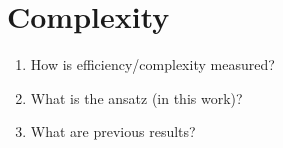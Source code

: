 \chapter{Complexity}
\label{chap:Complexity}

\begin{enumerate}
 \item How is efficiency/complexity measured?
 \item What is the ansatz (in this work)?
 \item What are previous results?
\end{enumerate}
